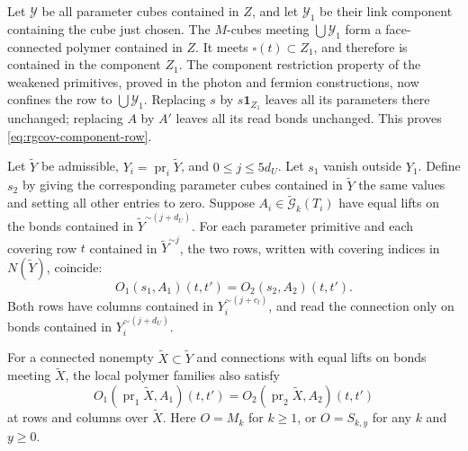 Let $\mathscr Y$ be all parameter cubes contained in $Z$,
and let $\mathscr Y_1$ be their link component containing
the cube just chosen. The $M$-cubes meeting
$\bigcup\mathscr Y_1$ form a face-connected polymer
contained in $Z$. It meets $\square(t)\subset Z_1$,
and therefore is contained in the component $Z_1$.
The component restriction property of the weakened
primitives, proved in the photon and fermion constructions,
now confines the row to $\bigcup\mathscr Y_1$.
Replacing $s$ by $s\mathbf1_{Z_1}$ leaves all its
parameters there unchanged; replacing $A$ by $A'$
leaves all its read bonds unchanged. This proves
\eqref{eq:rgcov-component-row}.

\begin{proposition}\label{prop:rgcov-supported-rows}
Let $\widetilde Y$ be admissible, $Y_i=\operatorname{pr}_i
\widetilde Y$, and $0\le j\le5d_U$. Let $s_1$ vanish
outside $Y_1$. Define $s_2$ by giving the corresponding
parameter cubes contained in $\widetilde Y$ the same
values and setting all other entries to zero.
Suppose $A_i\in\widetilde{\mathcal G}_k(T_i)$ have equal
lifts on the bonds contained in
$\widetilde Y^{\sim(j+d_U)}$.
For each parameter primitive and each covering row $t$
contained in $\widetilde Y^{\sim j}$, the two rows,
written with covering indices in $N(\widetilde Y)$,
coincide:
\begin{equation}\label{eq:rgcov-local-primitive-row}
                 O_1(s_1,A_1)(t,t')=O_2(s_2,A_2)(t,t').
\end{equation}
Both rows have columns contained in
$Y_i^{\sim(j+c_l)}$, and read the connection only on
bonds contained in $Y_i^{\sim(j+d_U)}$.

For a connected nonempty $\widetilde X\subset\widetilde Y$
and connections with equal lifts on bonds meeting
$\widetilde X$, the local polymer families also satisfy
\begin{equation}\label{eq:rgcov-local-polymer-kernel}
 O_1(\operatorname{pr}_1\widetilde X,A_1)(t,t')
       =O_2(\operatorname{pr}_2\widetilde X,A_2)(t,t')
\end{equation}
at rows and columns over $\widetilde X$.
Here $O=M_k$ for $k\ge1$, or $O=S_{k,y}$ for any $k$
and $y\ge0$.
\end{proposition}

